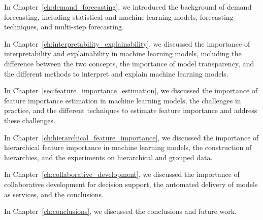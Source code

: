 
In Chapter~\ref{ch:demand_forecasting}, we introduced the background of demand forecasting, including statistical and machine learning models, forecasting techniques, and multi-step forecasting.

In Chapter~\ref{ch:interpretability_explainability}, we discussed the importance of interpretability and explainability in machine learning models, including the difference between the two concepts, the importance of model transparency, and the different methods to interpret and explain machine learning models.

In Chapter~\ref{sec:feature_importance_estimation}, we discussed the importance of feature importance estimation in machine learning models, the challenges in practice, and the different techniques to estimate feature importance and address these challenges.

In Chapter~\ref{ch:hierarchical_feature_importance}, we discussed the importance of hierarchical feature importance in machine learning models, the construction of hierarchies, and the experiments on hierarchical and grouped data.

In Chapter~\ref{ch:collaborative_development}, we discussed the importance of collaborative development for decision support, the automated delivery of models as services, and the conclusions.

In Chapter~\ref{ch:conclusions}, we discussed the conclusions and future work.